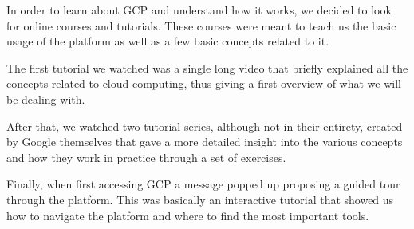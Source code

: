 In order to learn about GCP and understand how it works, we decided to
look for online courses and tutorials. These courses were meant to
teach us the basic usage of the platform as well as a few basic
concepts related to it. 

The first tutorial\cite{udemy-tutorial} we watched was a single long
video that briefly explained all the concepts related to cloud
computing, thus giving a first overview of what we will be dealing
with.

After that, we watched two tutorial
series\cite{coursera-fundamentals}\cite{coursera-infrastructure},
although not in their entirety, created by Google themselves that gave
a more detailed insight into the various concepts and how they work in
practice through a set of exercises.

Finally, when first accessing GCP a message popped up proposing a
guided tour through the platform. This was basically an interactive
tutorial that showed us how to navigate the platform and where to find
the most important tools.
